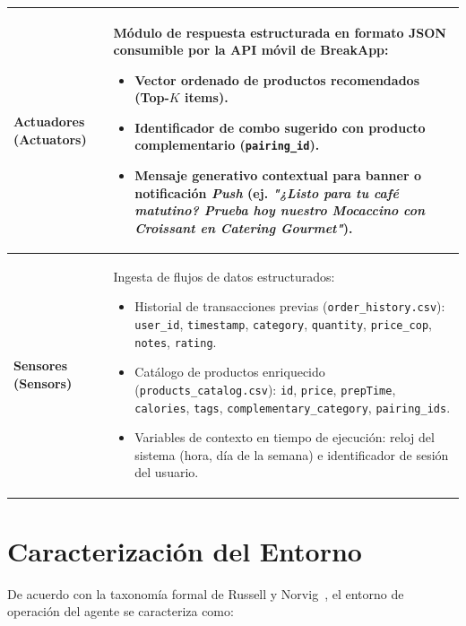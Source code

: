 \documentclass{article}
\begin{document}
\begin{longtable}{|>{\bfseries}p{} |p{}|}
    Actuadores (Actuators)
    &
    Módulo de respuesta estructurada en formato JSON consumible por la API móvil de BreakApp:
    \begin{itemize}
        \item Vector ordenado de productos recomendados (Top-$K$ items).
        \item Identificador de combo sugerido con producto complementario (\texttt{pairing\_id}).
        \item Mensaje generativo contextual para banner o notificación \textit{Push} (ej. \textit{"¿Listo para tu café matutino? Prueba hoy nuestro Mocaccino con Croissant en Catering Gourmet"}).
    \end{itemize}
    \\ \hline

    Sensores (Sensors)
    &
    Ingesta de flujos de datos estructurados:
    \begin{itemize}
        \item Historial de transacciones previas (\texttt{order\_history.csv}): \texttt{user\_id}, \texttt{timestamp}, \texttt{category}, \texttt{quantity}, \texttt{price\_cop}, \texttt{notes}, \texttt{rating}.
        \item Catálogo de productos enriquecido (\texttt{products\_catalog.csv}): \texttt{id}, \texttt{price}, \texttt{prepTime}, \texttt{calories}, \texttt{tags}, \texttt{complementary\_category}, \texttt{pairing\_ids}.
        \item Variables de contexto en tiempo de ejecución: reloj del sistema (hora, día de la semana) e identificador de sesión del usuario.
    \end{itemize}
    \\

\end{longtable}

\section{Caracterización del Entorno}

De acuerdo con la taxonomía formal de Russell y Norvig~\cite{russell2020artificial}, el entorno de operación del agente se caracteriza como:
\end{document}
